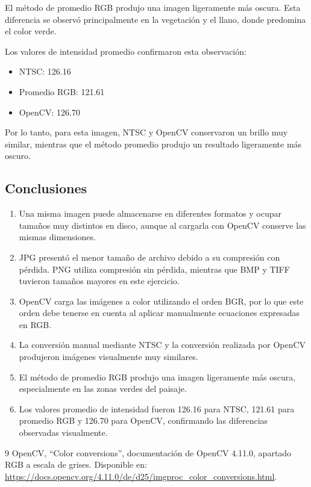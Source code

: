 \documentclass[11pt,a4paper]{article}
\begin{document}
El método de promedio RGB produjo una imagen ligeramente más oscura. Esta
diferencia se observó principalmente en la vegetación y el llano, donde
predomina el color verde.

Los valores de intensidad promedio confirmaron esta observación:

\begin{itemize}
    \item NTSC: 126.16
    \item Promedio RGB: 121.61
    \item OpenCV: 126.70
\end{itemize}

Por lo tanto, para esta imagen, NTSC y OpenCV conservaron un brillo muy
similar, mientras que el método promedio produjo un resultado ligeramente
más oscuro.

\subsection{Conclusiones}

\begin{enumerate}

    \item Una misma imagen puede almacenarse en diferentes formatos y ocupar
    tamaños muy distintos en disco, aunque al cargarla con OpenCV conserve
    las mismas dimensiones.

    \item JPG presentó el menor tamaño de archivo debido a su compresión con
    pérdida. PNG utiliza compresión sin pérdida, mientras que BMP y TIFF
    tuvieron tamaños mayores en este ejercicio.

    \item OpenCV carga las imágenes a color utilizando el orden BGR, por lo
    que este orden debe tenerse en cuenta al aplicar manualmente ecuaciones
    expresadas en RGB.

    \item La conversión manual mediante NTSC y la conversión realizada por
    OpenCV produjeron imágenes visualmente muy similares.

    \item El método de promedio RGB produjo una imagen ligeramente más
    oscura, especialmente en las zonas verdes del paisaje.

    \item Los valores promedio de intensidad fueron 126.16 para NTSC,
    121.61 para promedio RGB y 126.70 para OpenCV, confirmando las
    diferencias observadas visualmente.

\end{enumerate}

\begin{thebibliography}{9}
 OpenCV, ``Color conversions'', documentaci\'on de
OpenCV 4.11.0, apartado RGB a escala de grises. Disponible en:
\url{https://docs.opencv.org/4.11.0/de/d25/imgproc_color_conversions.html}.
\end{thebibliography}
\end{document}
